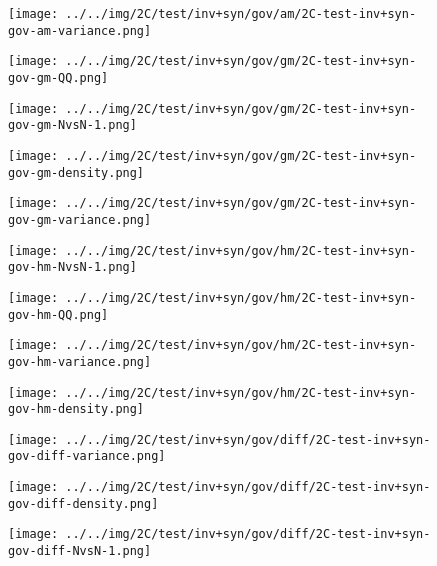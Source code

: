 \begin{figure}[H]
\centering	\texttt{[image: ../../img/2C/test/inv+syn/gov/am/2C-test-inv+syn-gov-am-variance.png]}
\end{figure}
\begin{figure}[H]
\centering	\texttt{[image: ../../img/2C/test/inv+syn/gov/gm/2C-test-inv+syn-gov-gm-QQ.png]}
\end{figure}
\begin{figure}[H]
\centering	\texttt{[image: ../../img/2C/test/inv+syn/gov/gm/2C-test-inv+syn-gov-gm-NvsN-1.png]}
\end{figure}
\begin{figure}[H]
\centering	\texttt{[image: ../../img/2C/test/inv+syn/gov/gm/2C-test-inv+syn-gov-gm-density.png]}
\end{figure}
\begin{figure}[H]
\centering	\texttt{[image: ../../img/2C/test/inv+syn/gov/gm/2C-test-inv+syn-gov-gm-variance.png]}
\end{figure}
\begin{figure}[H]
\centering	\texttt{[image: ../../img/2C/test/inv+syn/gov/hm/2C-test-inv+syn-gov-hm-NvsN-1.png]}
\end{figure}
\begin{figure}[H]
\centering	\texttt{[image: ../../img/2C/test/inv+syn/gov/hm/2C-test-inv+syn-gov-hm-QQ.png]}
\end{figure}
\begin{figure}[H]
\centering	\texttt{[image: ../../img/2C/test/inv+syn/gov/hm/2C-test-inv+syn-gov-hm-variance.png]}
\end{figure}
\begin{figure}[H]
\centering	\texttt{[image: ../../img/2C/test/inv+syn/gov/hm/2C-test-inv+syn-gov-hm-density.png]}
\end{figure}
\begin{figure}[H]
\centering	\texttt{[image: ../../img/2C/test/inv+syn/gov/diff/2C-test-inv+syn-gov-diff-variance.png]}
\end{figure}
\begin{figure}[H]
\centering	\texttt{[image: ../../img/2C/test/inv+syn/gov/diff/2C-test-inv+syn-gov-diff-density.png]}
\end{figure}
\begin{figure}[H]
\centering	\texttt{[image: ../../img/2C/test/inv+syn/gov/diff/2C-test-inv+syn-gov-diff-NvsN-1.png]}
\end{figure}
